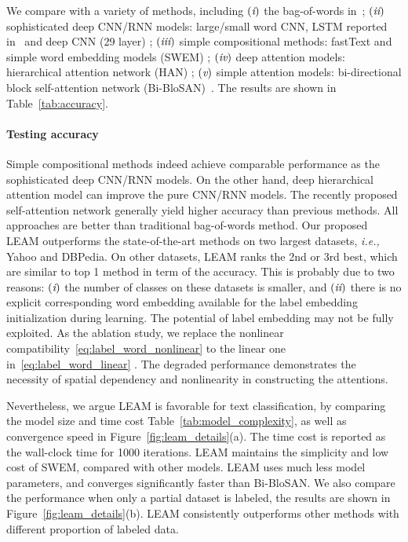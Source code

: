 \documentclass[11pt,a4paper]{article}
\newcommand{\ie}[0]{\emph{i.e., }}
\newcommand{\RN}[1]{\textup{\lowercase\expandafter{\it \romannumeral#1}}}
\begin{document}
We compare with a variety of methods, including 
$(\RN{1})$ the bag-of-words in~\citep{zhang2015character}; 
$(\RN{2})$ sophisticated deep CNN/RNN models: large/small word CNN,  LSTM reported in~\citep{zhang2015character,dai2015semi} and deep CNN (29 layer) \citep{conneau2017very};
$(\RN{3})$ simple compositional methods: fastText \citep{joulin2016bag} and simple word embedding models (SWEM) \citep{shen2018on};
$(\RN{4})$ deep attention models: hierarchical attention network (HAN) \citep{yang2016hierarchical};
$(\RN{5})$ simple attention models: bi-directional block self-attention network
(Bi-BloSAN)~\citep{shen2018bi}.
The results are shown in Table~\ref{tab:accuracy}. 

\paragraph{Testing accuracy} Simple compositional methods indeed achieve comparable performance as the sophisticated deep CNN/RNN models. On the other hand, deep hierarchical attention model can improve the pure CNN/RNN models. The recently proposed self-attention network generally yield higher accuracy than previous methods. All approaches are better than traditional bag-of-words method. Our proposed LEAM outperforms the state-of-the-art methods on two largest datasets, \ie Yahoo and DBPedia. On other datasets, LEAM ranks the 2nd or 3rd best, which are similar to top 1 method in term of the accuracy. This is probably due to two reasons: 
$(\RN{1})$ the number of classes on these datasets is smaller, and
$(\RN{2})$ there is no explicit corresponding word embedding available for the label embedding initialization during learning. The potential of label embedding may not be fully exploited. As the ablation study, we replace the nonlinear compatibility~\eqref{eq:label_word_nonlinear} to the linear one in~\eqref{eq:label_word_linear} . The degraded performance demonstrates the necessity of spatial dependency and nonlinearity in constructing the attentions.

Nevertheless, we argue LEAM is favorable for text classification, by comparing the model size and time cost Table~\ref{tab:model_complexity}, as well as convergence speed in Figure~\ref{fig:leam_details}(a). The time cost is reported as the wall-clock time for 1000 iterations. LEAM maintains the simplicity and low cost of SWEM, compared with other models. LEAM uses much less model parameters, and converges significantly faster than Bi-BloSAN.
We also compare the performance when only a partial dataset is labeled, the results are shown in Figure~\ref{fig:leam_details}(b). LEAM consistently  outperforms other methods with different proportion of labeled data.
\end{document}
